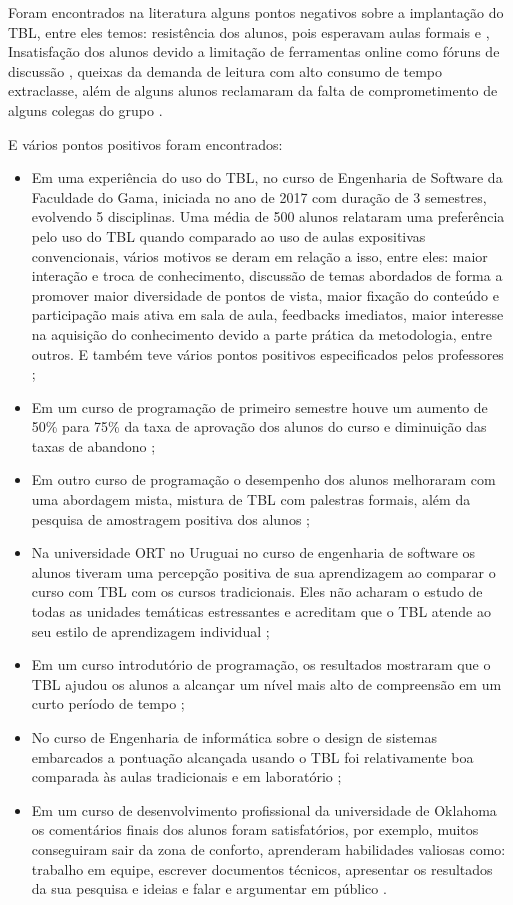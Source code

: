 Foram encontrados na literatura alguns pontos negativos sobre a implantação do TBL, entre eles temos: resistência dos alunos, pois esperavam aulas formais \cite{davis} e \cite{matalonga}, Insatisfação dos alunos devido a limitação de ferramentas online como fóruns de discussão \cite{awatramani}, queixas da demanda de leitura com alto consumo de tempo extraclasse, além de alguns alunos reclamaram da falta de comprometimento de alguns colegas do grupo \cite{ramos}.

E vários pontos positivos foram encontrados:

\begin{itemize}
  \item Em uma experiência do uso do TBL, no curso de Engenharia de Software da Faculdade do Gama, iniciada no ano de 2017 com duração de 3 semestres, evolvendo 5 disciplinas. Uma média de 500 alunos relataram uma preferência pelo uso do TBL quando comparado ao uso de aulas expositivas convencionais, vários motivos se deram em relação a isso, entre eles: maior interação e troca de conhecimento, discussão de temas abordados de forma a promover maior diversidade de pontos de vista, maior fixação do conteúdo e participação mais ativa em sala de aula, feedbacks imediatos, maior interesse na aquisição do conhecimento devido a parte prática da metodologia, entre outros. E também teve vários pontos positivos especificados pelos professores \cite{ramos};
  \item Em um curso de programação de primeiro semestre houve um aumento de 50\% para 75\% da taxa de aprovação dos alunos do curso e diminuição das taxas de abandono \cite{matalonga};
  \item Em outro curso de programação o desempenho dos alunos melhoraram com uma abordagem mista, mistura de TBL com palestras formais, além da pesquisa de amostragem positiva dos alunos \cite{elnagar};
  \item Na universidade ORT no Uruguai no curso de engenharia de software os alunos tiveram uma percepção positiva de sua aprendizagem ao comparar o curso com TBL com os cursos tradicionais. Eles não acharam o estudo de todas as unidades temáticas estressantes e acreditam que o TBL atende ao seu estilo de aprendizagem individual \cite{matalonga};
  \item Em um curso introdutório de programação, os resultados mostraram que o TBL ajudou os alunos a alcançar um nível
    mais alto de compreensão em um curto período de tempo \cite{cabrera};
  \item No curso de Engenharia de informática sobre o design de sistemas embarcados a pontuação alcançada usando o TBL foi relativamente boa comparada às aulas tradicionais e em laboratório \cite{awatramani};
  \item Em um curso de desenvolvimento profissional da universidade de Oklahoma os comentários finais dos alunos foram satisfatórios, por exemplo, muitos conseguiram sair da zona de conforto, aprenderam habilidades valiosas como: trabalho em equipe, escrever documentos técnicos, apresentar os resultados da sua pesquisa e ideias e falar e argumentar em público \cite{davis}.
\end{itemize}

